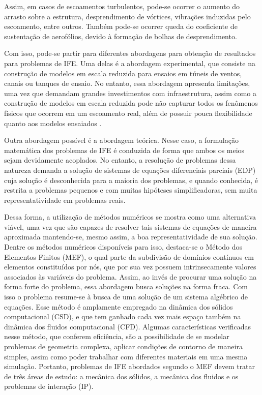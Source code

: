 Assim, em casos de escoamentos turbulentos, pode-se ocorrer o aumento do arrasto sobre a estrutura, desprendimento de vórtices, vibrações induzidas pelo escoamento, entre outros. Também pode-se ocorrer queda do coeficiente de sustentação de aerofólios, devido à formação de bolhas de desprendimento.

Com isso, pode-se partir para diferentes abordagens para obtenção de resultados para problemas de IFE. Uma delas é a abordagem experimental, que consiste na construção de modelos em escala reduzida para ensaios em túneis de ventos, canais ou tanques de ensaio. No entanto, essa abordagem apresenta limitações, uma vez que demandam grandes investimentos com infraestrutura, assim como a construção de modelos em escala reduzida pode não capturar todos os fenômenos físicos que ocorrem em um escoamento real, além de possuir pouca flexibilidade quanto aos modelos ensaiados \cite{fernandes2020tecnica}.

Outra abordagem possível é a abordagem teórica. Nesse caso, a formulação matemática dos problemas de IFE é conduzida de forma que ambos os meios sejam devidamente acoplados. No entanto, a resolução de problemas dessa natureza demanda a solução de sistemas de equações diferenciais parciais (EDP) cuja solução é desconhecida para a maioria dos problemas, e quando conhecida, é restrita a problemas pequenos e com muitas hipóteses simplificadoras, sem muita representatividade em problemas reais.%

Dessa forma, a utilização de métodos numéricos se mostra como uma alternativa viável, uma vez que são capazes de resolver tais sistemas de equações de maneira aproximada mantendo-se, mesmo assim, a boa representatividade de sua solução. Dentre os métodos numéricos disponíveis para isso, destaca-se o Método dos Elementos Finitos (MEF), o qual parte da subdivisão de domínios contínuos em elementos constituídos por nós, que por sua vez possuem intrinsecamente valores associados às variáveis do problema. Assim, ao invés de procurar uma solução na forma forte do problema, essa abordagem busca soluções na forma fraca. Com isso o problema resume-se à busca de uma solução de um sistema algébrico de equações. Esse método é amplamente empregado na dinâmica dos sólidos computacional (CSD), e que tem ganhado cada vez mais espaço também na dinâmica dos fluidos computacional (CFD). Algumas características verificadas nesse método, que conferem eficiência, são a possibilidade de se modelar problemas de geometria complexa, aplicar condições de contorno de maneira simples, assim como poder trabalhar com diferentes materiais em uma mesma simulação. Portanto, problemas de IFE abordados segundo o MEF devem tratar de três áreas de estudo: a mecânica dos sólidos, a mecânica dos fluidos e os problemas de interação (IP).

